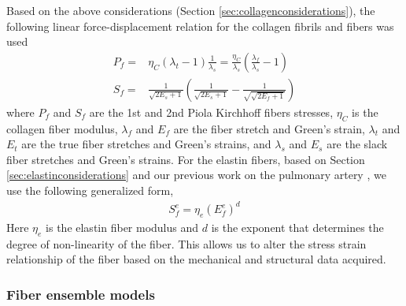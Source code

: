     Based on the above considerations (Section \ref{sec:collagenconsiderations}), the following linear force-displacement relation for the collagen fibrils and fibers was used
        \begin{equation}\label{eqn:collagenfiberlaw}
        \begin{aligned}
        P_f =& \eta_{C}\left(\lambda_t - 1\right)\frac{1}{\lambda_s} = \frac{\eta_C}{\lambda_s}\left(\frac{\lambda_f}{\lambda_s} - 1\right)    \\
        S_f =& \frac{1}{\sqrt{2E_s + 1}}\left( \frac{1}{\sqrt{2 E_s + 1}} - \frac{1}{\sqrt{\sqrt{2E_f + 1}}}\right)
        \end{aligned}
        \end{equation}
    where $P_f$ and $S_f$ are the 1st and 2nd Piola Kirchhoff fibers stresses, $\eta_C$ is the collagen fiber modulus, $\lambda_f$ and $E_f$ are the fiber stretch and Green’s strain, $\lambda_t$ and $E_t$ are the true fiber stretches and Green’s strains, and $\lambda_s$ and $E_s$ are the slack fiber stretches and Green’s strains. For the elastin fibers, based on Section \ref{sec:elastinconsiderations} and our previous work on the pulmonary artery \cite{fata_insights_2014}, we use the following generalized form,
        \begin{equation}\label{eqn:elastinfiberlaw}
        \begin{aligned}
        S^e_f = \eta_e \left( E^e_f\right)^d
        \end{aligned}
        \end{equation}
    Here $\eta_e$ is the elastin fiber modulus and $d$ is the exponent that determines the degree of non-linearity of the fiber. This allows us to alter the stress strain relationship of the fiber based on the mechanical and structural data acquired.




\subsubsection{Fiber ensemble models}

